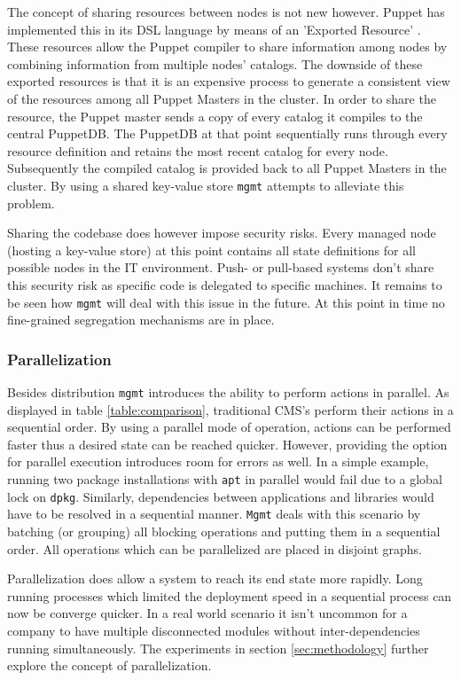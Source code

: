 The concept of sharing resources between nodes is not new however. Puppet has implemented this in its DSL language by means of an 'Exported Resource' \cite{exported_2016}. These resources allow the Puppet compiler to share information among nodes by combining information from multiple nodes’ catalogs. The downside of these exported resources is that it is an expensive process to generate a consistent view of the resources among all Puppet Masters in the cluster. In order to share the resource, the Puppet master sends a copy of every catalog it compiles to the central PuppetDB. The PuppetDB at that point sequentially runs through every resource definition and retains the most recent catalog for every node. Subsequently the compiled catalog is provided back to all Puppet Masters in the cluster. By using a shared key-value store \texttt{mgmt} attempts to alleviate this problem. 

Sharing the codebase does however impose security risks. Every managed node (hosting a key-value store) at this point contains all state definitions for all possible nodes in the IT environment. Push- or pull-based systems don't share this security risk as specific code is delegated to specific machines. It remains to be seen how \texttt{mgmt} will deal with this issue in the future. At this point in time no fine-grained segregation mechanisms are in place. 

\subsubsection{Parallelization}
Besides distribution \texttt{mgmt} introduces the ability to perform actions in parallel. As displayed in table \ref{table:comparison}, traditional CMS's perform their actions in a sequential order. By using a parallel mode of operation, actions can be performed faster thus a desired state can be reached quicker. However, providing the option for parallel execution introduces room for errors as well. In a simple example, running two package installations with \texttt{apt} in parallel would fail due to a global lock on \texttt{dpkg}. Similarly, dependencies between applications and libraries would have to be resolved in a sequential manner. \texttt{Mgmt} deals with this scenario by batching (or grouping) all blocking operations and putting them in a sequential order. All operations which can be parallelized are placed in disjoint graphs. 

Parallelization does allow a system to reach its end state more rapidly. Long running processes which limited the deployment speed in a sequential process can now be converge quicker. In a real world scenario it isn't uncommon for a company to have multiple disconnected modules without inter-dependencies running simultaneously. The experiments in section \ref{sec:methodology} further explore the concept of parallelization. 

